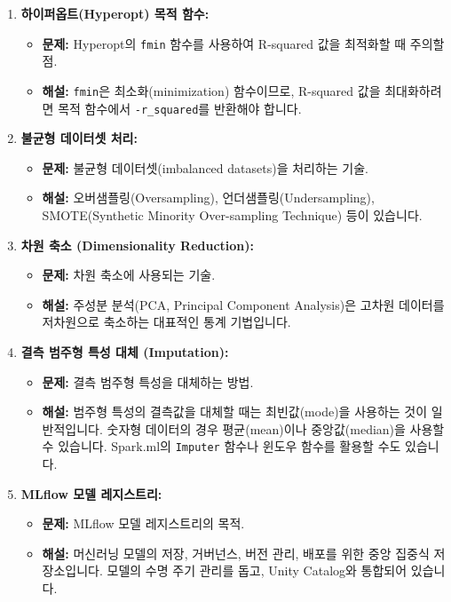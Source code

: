 \documentclass[11pt,a4paper]{article}
\theoremstyle{definition}
\begin{document}
\begin{enumerate}
    \item \textbf{하이퍼옵트(Hyperopt) 목적 함수:}
    \begin{itemize}
        \item \textbf{문제:} Hyperopt의 \texttt{fmin} 함수를 사용하여 R-squared 값을 최적화할 때 주의할 점.
        \item \textbf{해설:} \texttt{fmin}은 최소화(minimization) 함수이므로, R-squared 값을 최대화하려면 목적 함수에서 \texttt{-r_squared}를 반환해야 합니다.
    \end{itemize}

    \item \textbf{불균형 데이터셋 처리:}
    \begin{itemize}
        \item \textbf{문제:} 불균형 데이터셋(imbalanced datasets)을 처리하는 기술.
        \item \textbf{해설:} 오버샘플링(Oversampling), 언더샘플링(Undersampling), SMOTE(Synthetic Minority Over-sampling Technique) 등이 있습니다.
    \end{itemize}

    \item \textbf{차원 축소 (Dimensionality Reduction):}
    \begin{itemize}
        \item \textbf{문제:} 차원 축소에 사용되는 기술.
        \item \textbf{해설:} 주성분 분석(PCA, Principal Component Analysis)은 고차원 데이터를 저차원으로 축소하는 대표적인 통계 기법입니다.
    \end{itemize}

    \item \textbf{결측 범주형 특성 대체 (Imputation):}
    \begin{itemize}
        \item \textbf{문제:} 결측 범주형 특성을 대체하는 방법.
        \item \textbf{해설:} 범주형 특성의 결측값을 대체할 때는 최빈값(mode)을 사용하는 것이 일반적입니다. 숫자형 데이터의 경우 평균(mean)이나 중앙값(median)을 사용할 수 있습니다. Spark.ml의 \texttt{Imputer} 함수나 윈도우 함수를 활용할 수도 있습니다.
    \end{itemize}

    \item \textbf{MLflow 모델 레지스트리:}
    \begin{itemize}
        \item \textbf{문제:} MLflow 모델 레지스트리의 목적.
        \item \textbf{해설:} 머신러닝 모델의 저장, 거버넌스, 버전 관리, 배포를 위한 중앙 집중식 저장소입니다. 모델의 수명 주기 관리를 돕고, Unity Catalog와 통합되어 있습니다.
    \end{itemize}


\end{enumerate}
\end{document}
